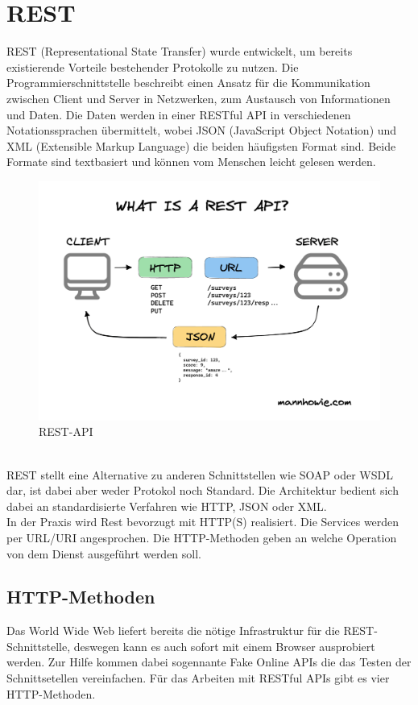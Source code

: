 \section{REST}
REST (Representational State Transfer) wurde entwickelt, um 
bereits existierende Vorteile bestehender Protokolle zu nutzen. 
Die Programmierschnittstelle beschreibt einen Ansatz für die 
Kommunikation zwischen Client und Server in Netzwerken, zum Austausch von Informationen und Daten. 
Die Daten werden in einer RESTful API in verschiedenen Notationssprachen übermittelt, wobei 
JSON (JavaScript Object Notation) und XML (Extensible Markup Language) die beiden häufigsten Format sind.
Beide Formate sind textbasiert und können vom Menschen leicht gelesen werden.
\begin{figure}[ht!]
  \centering
  \includegraphics[scale=.4]{pics/rest-api.png}
  \caption{\label{fig:The-caption}REST-API \cite{APCW20011}}
  \label{fig:impl:use-case-diagramm}
\end{figure}
\\
REST stellt eine Alternative zu anderen Schnittstellen wie SOAP oder WSDL dar, ist
dabei aber weder Protokol noch Standard. Die Architektur bedient sich dabei 
an standardisierte Verfahren wie HTTP, JSON oder XML.
\\
In der Praxis wird Rest bevorzugt mit HTTP(S) realisiert. Die Services 
werden per URL/URI angesprochen. Die HTTP-Methoden geben an welche Operation
von dem Dienst ausgeführt werden soll.\cite{APCW20010}
\\
\subsection{HTTP-Methoden}
Das World Wide Web liefert bereits die nötige Infrastruktur für die 
REST-Schnittstelle, deswegen kann es auch sofort mit einem Browser
ausprobiert werden. Zur Hilfe kommen dabei sogennante Fake Online APIs 
die das Testen der Schnittsetellen vereinfachen. 
Für das Arbeiten mit RESTful APIs gibt es vier HTTP-Methoden.

